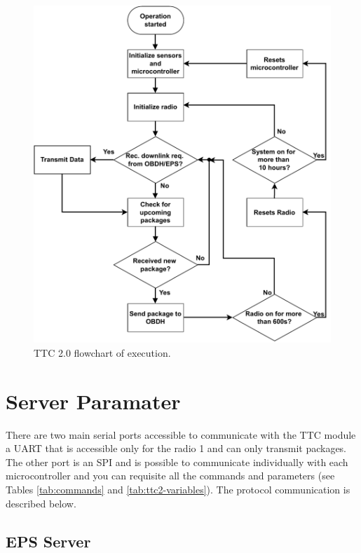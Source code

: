 \begin{figure}[!ht]
    \begin{center}
        \includegraphics[width=\textwidth]{figures/ttc2-flowchart.pdf}
        \caption{TTC 2.0 flowchart of execution.}
        \label{fig:ttc_flowchart}
    \end{center}
\end{figure}

\section{Server Paramater}

There are two main serial ports accessible to communicate with the TTC module a UART that is accessible only for the radio 1 and can only transmit packages. The other port is an SPI and is possible to communicate individually with each microcontroller and you can requisite all the commands and parameters (see Tables \ref{tab:commands} and \ref{tab:ttc2-variables}). The protocol communication is described below.

\subsection{EPS Server}

